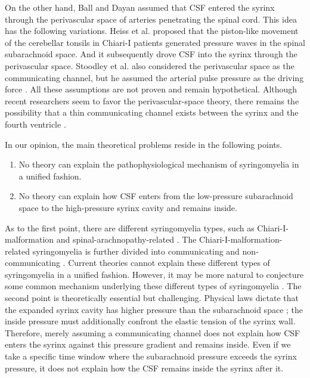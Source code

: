 \documentclass[fleqn,10pt]{wlscirep}
\begin{document}
On the other hand, Ball and Dayan \cite{ball1972pathogenesis} assumed that
CSF entered the syrinx through the perivascular space of arteries
penetrating the spinal cord. This idea has the following variations. Heiss
et al.  \cite{heiss1999elucidating} proposed that the piston-like movement
of the cerebellar tonsils in Chiari-I patients generated pressure waves in
the spinal subarachnoid space. And it subsequently drove CSF into the
syrinx through the perivascular space. Stoodley et al. also considered the
perivascular space as the communicating channel, but he assumed the
arterial pulse pressure as the driving force \cite{stoodley2000mechanisms}.
All these assumptions are not proven and remain hypothetical. Although
recent researchers seem to favor the perivascular-space theory, there
remains the possibility that a thin communicating channel exists between
the syrinx and the fourth ventricle \cite{chang2021hypothesis}. 

In our opinion, the main theoretical problems reside in the following
points.
\begin{enumerate}
    \item No theory can explain the pathophysiological mechanism of
syringomyelia in a unified fashion.
    \item No theory can explain how CSF enters from the low-pressure subarachnoid space to the high-pressure syrinx cavity and remains inside.
\end{enumerate}

As to the first point, there are different syringomyelia types, such as
Chiari-I-malformation and spinal-arachnopathy-related
\cite{klekamp1997treatment}. The Chiari-I-malformation-related
syringomyelia is further divided into communicating and non-communicating
\cite{elliott2013syringomyelia}. Current theories cannot explain these
different types of syringomyelia in a unified fashion. However, it may be
more natural to conjecture some common mechanism underlying these different
types of syringomyelia \cite{stoodley2000mechanisms}. The second point is
theoretically essential but challenging. Physical laws dictate that the
expanded syrinx cavity has higher pressure than the subarachnoid space
\cite{serwayr.a.2016fluids, heiss1999elucidating, davis1989mechanisms,
ellertsson1970distending}; the inside pressure must additionally confront
the elastic tension of the syrinx wall. Therefore, merely assuming a
communicating channel does not explain how CSF enters the syrinx against
this pressure gradient and remains inside. Even if we take a specific time
window where the subarachnoid pressure exceeds the syrinx pressure, it does
not explain how the CSF remains inside the syrinx after it.
\end{document}
